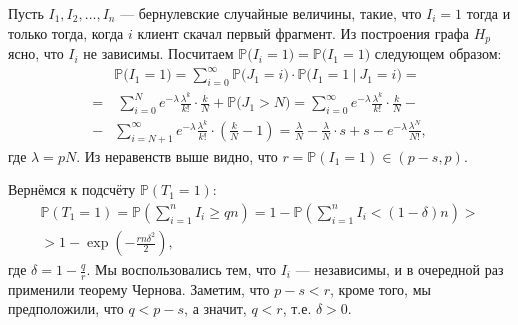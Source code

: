 \documentclass{matmex-diploma-custom}
\newcommand{\PRob}{\mathbb P}
\newcommand{\geqs}{\geqslant}
\theoremstyle{named}
\begin{document}
Пусть $I_1, I_2, \dots, I_n$ --- бернулевские случайные величины, такие, что $I_i = 1$ тогда и только тогда, 
когда $i$ клиент скачал первый фрагмент. Из построения графа $H_p$ ясно, что $I_i$ не зависимы.
Посчитаем $\PRob\big(I_i = 1\big) = \PRob\big(I_1 = 1\big)$ следующем образом:
\begin{equation}\begin{aligned}
&\PRob\big(I_1 = 1\big) = \sum_{i = 0}^\infty \PRob\big(J_1 = i\big) \cdot \PRob\Big(I_1 = 1 ~\big|~ J_1 = i\Big) 
	= 
\\
	= 
&~\sum_{i = 0}^N e^{-\lambda} \frac{\lambda^k}{k!} \cdot \frac {k}{N} + \PRob\big(J_1 > N\big)
	=
\sum_{i = 0}^{\infty} e^{-\lambda} \frac{\lambda^k}{k!} \cdot \frac {k}{N}  
	- 
	\\
	-
&\sum_{i = N + 1}^{\infty} e^{-\lambda} \frac{\lambda^k}{k!} \cdot \left(\frac {k}{N} - 1\right)
	=
\frac{\lambda}{N} - \frac{\lambda}{N} \cdot s + s - e^{-\lambda} \frac{\lambda^N}{N!},
\end{aligned}\end{equation}
где $\lambda = pN$. Из неравенств выше видно, что $r = \PRob(I_1 = 1) \in (p - s, p)$.

Вернёмся к подсчёту $\PRob(T_1 = 1)$:
\begin{equation}\begin{aligned}
\PRob(T_1 = 1) = \PRob\left(\sum_{i=1}^n I_i \geqs qn\right) 
	= 
1 - \PRob\left(\sum_{i=1}^n I_i < (1-\delta)n\right)
	>
\\
	>
1 - \exp \left( - \frac{rn \delta^2}{2} \right),
\end{aligned}\end{equation}
где $\delta = 1 - \frac{q}{r}$. Мы воспользовались тем, что $I_i$ --- независимы, и в очередной раз применили теорему Чернова. 
Заметим, что $p - s < r$, кроме того, мы предположили, что $q < p-s$, а значит, $q < r$, т.е. $\delta > 0$.
\end{document}
